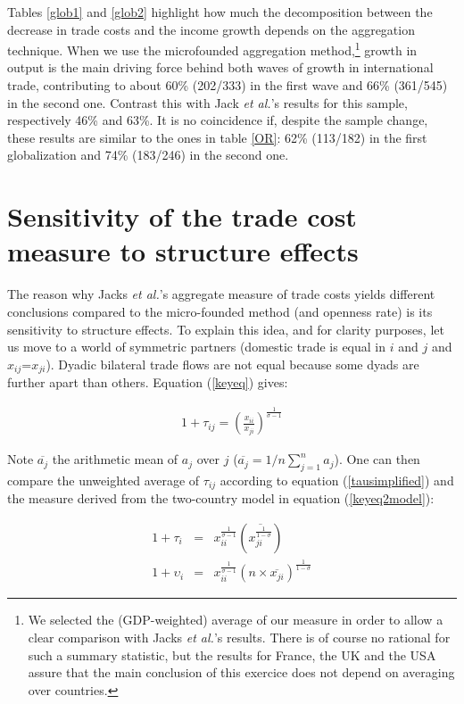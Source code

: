 \documentclass{article}
\begin{document}
Tables \ref{glob1} and \ref{glob2} highlight how much the decomposition
between the decrease in trade costs and the income growth depends on the aggregation technique. When we use the microfounded aggregation method,\footnote{We selected the (GDP-weighted) average of our measure in order
to allow a clear comparison with Jacks \textit{et al.}'s results. There
is of course no rational for such a summary statistic, but the
results for France, the UK and the USA assure that the main
conclusion of this exercice does not depend on averaging over
countries.} 
growth in output is the main driving force behind both waves of growth in international trade, contributing to about 60\% (202/333) in the first wave and 66\% (361/545) in the second one. Contrast this with Jack  \textit{et al.}'s results for this sample, respectively 46\% and 63\%.
It is no coincidence if, despite the sample change, these results are similar to the ones in table \ref{OR}: 62\% (113/182) in the first globalization and 74\% (183/246) in the second one.

\section{\label{3} Sensitivity of the trade cost measure to
structure effects}

The reason why Jacks \textit{et al.}'s aggregate measure of trade costs yields different conclusions compared to the micro-founded method (and openness rate) is its sensitivity to structure
effects. To explain this idea, and for clarity purposes, let us move to a world of symmetric partners (domestic trade is equal in $i$ and $j$ and $x_{ij}$=$x_{ji}$).  Dyadic bilateral trade flows are not equal because some dyads are further apart than others. Equation (\ref{keyeq}) gives: 

\begin{eqnarray}
1+\tau_{ij}= \left(\frac{x_{ii}}{x_{ji}}\right)^{\frac{1}{\sigma-1}}\label{tausimplified}
\end{eqnarray}

Note $\overline{a_j}$ the arithmetic mean
of $a_j$ over $j$ ($\overline{a_j}=1/n \sum_{j=1}^{n}a_j$). One can
then compare the unweighted average of $\tau_{ij}$ according to equation 
(\ref{tausimplified}) and the measure derived from the
two-country model in equation (\ref{keyeq2model}):

\begin{eqnarray}
1+\tau_i&=& x_{ii}^{\frac{1}{\sigma-1}} \left(\overline{{x_{ji}^{\frac{1}{1-\sigma}}}}\right) \label{tau}\\
1+\upsilon_i&=&x_{ii}^{\frac{1}{\sigma-1}} (n \times \overline{x_{ji}})^{\frac{1}{1-\sigma}}\label{upsilon}
\end{eqnarray}
\end{document}
